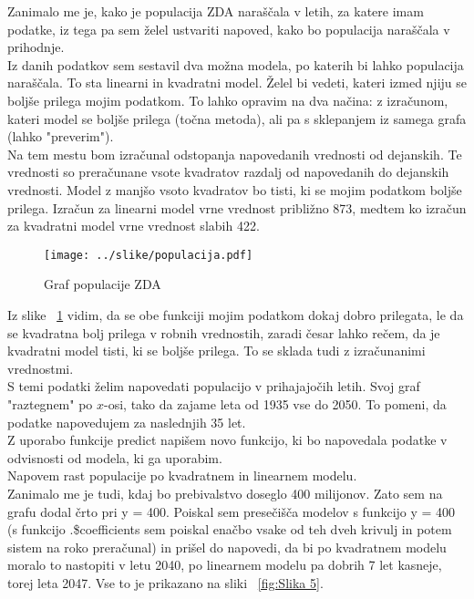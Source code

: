\documentclass[11pt,a4paper]{article}
\begin{document}
Zanimalo me je, kako je populacija ZDA naraščala v letih, za katere imam podatke, iz tega pa sem želel ustvariti napoved, kako bo populacija naraščala v prihodnje. \\
Iz danih podatkov sem sestavil dva možna modela, po katerih bi lahko populacija naraščala. To sta linearni in kvadratni model. Želel bi vedeti, kateri izmed njiju se boljše prilega mojim podatkom. To lahko opravim na dva načina: z izračunom, kateri model se boljše prilega (točna metoda), ali pa s sklepanjem iz samega grafa (lahko "preverim").\\
Na tem mestu bom izračunal odstopanja napovedanih vrednosti od dejanskih. Te vrednosti so preračunane vsote kvadratov razdalj od napovedanih do dejanskih vrednosti. Model z manjšo vsoto kvadratov bo tisti, ki se mojim podatkom boljše prilega. Izračun za linearni model vrne vrednost približno 873, medtem ko izračun za kvadratni model vrne vrednost slabih 422.  \\

\begin{figure}[H]
  \texttt{[image: ../slike/populacija.pdf]}\\
  \caption{Graf populacije ZDA}
  \label{fig:Slika 4}
\end{figure}

Iz slike ~\ref{fig:Slika 4} vidim, da se obe funkciji mojim podatkom dokaj dobro prilegata, le da se kvadratna bolj prilega v robnih vrednostih, zaradi česar lahko rečem, da je kvadratni model tisti, ki se boljše prilega. To se sklada tudi z izračunanimi vrednostmi.\\

S temi podatki želim napovedati populacijo v prihajajočih letih. Svoj graf "raztegnem" po $x$-osi, tako da zajame leta od 1935 vse do 2050. To pomeni, da podatke napovedujem za naslednjih 35 let. \\
Z uporabo funkcije predict napišem novo funkcijo, ki bo napovedala podatke v odvisnosti od modela, ki ga uporabim.\\
Napovem rast populacije po kvadratnem in linearnem modelu.\\
Zanimalo me je tudi, kdaj bo prebivalstvo doseglo 400 milijonov. Zato sem na grafu dodal črto pri y = 400. Poiskal sem presečišča modelov s funkcijo y = 400 (s funkcijo 
.\$coefficients sem poiskal enačbo vsake od teh dveh krivulj in potem sistem na roko preračunal) in prišel do napovedi, da bi po kvadratnem modelu moralo to nastopiti v letu 2040, po linearnem modelu pa dobrih 7 let kasneje, torej leta 2047. Vse to je prikazano na sliki ~\ref{fig:Slika 5}.\\
\end{document}
